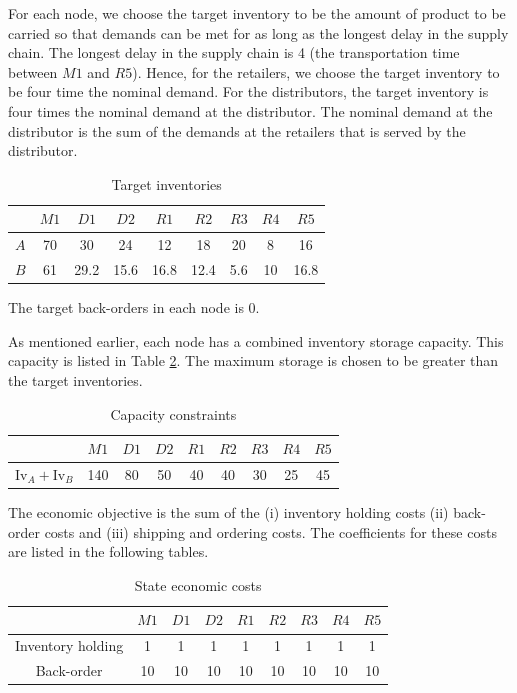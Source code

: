 \documentclass[10pt]{article}
\newcommand{\Inv}{\textrm{Iv}}
\theoremstyle{definition}
\begin{document}
For each node, we choose the target inventory to be the amount of
product to be carried so that demands can be met for as long as the
longest delay in the supply chain. The longest delay in the supply
chain is 4 (the transportation time between $M1$ and $R5$). Hence, for
the retailers, we choose the target inventory to be four time the
nominal demand. For the distributors, the target inventory is four
times the nominal demand at the distributor. The nominal demand at the
distributor is the sum of the demands at the retailers that is served
by the distributor. 

\begin{table}
\caption{Target inventories}
\label{tab:targinv}
\begin{center}
\begin{tabular}{ccccccccc}\toprule
& $M1$ & $D1$ & $D2$  & $R1$ & $R2$ & $R3$ & $R4$ & $R5$ \\
\midrule
$A$&70&30  &24   &12  &18  &20 &8 &16\\
$B$&61&29.2&15.6 &16.8&12.4&5.6&10&16.8 \\
\bottomrule
\end{tabular}
\end{center}
\end{table}

The target back-orders in each node is $0$.

As mentioned earlier, each node has a combined inventory storage
capacity. This capacity is listed in Table \ref{tab:constraints}. The
maximum storage is chosen to be greater than the target inventories.
\begin{table}
\caption{Capacity constraints}
\label{tab:constraints}
\begin{center}
\begin{tabular}{ccccccccc}\toprule
& $M1$ & $D1$ & $D2$  & $R1$ & $R2$ & $R3$ & $R4$ & $R5$ \\
\midrule
$\Inv_A+\Inv_B$&140&80  &50   &40  &40  &30 &25 &45\\
\bottomrule
\end{tabular}
\end{center}
\end{table}

The economic objective is the sum of the (i) inventory holding costs
(ii) back-order costs and (iii) shipping and ordering costs. The
coefficients for these costs are listed in the following tables.

\begin{table}
\caption{State economic costs}
\label{tab:state_economic}
\begin{center}
\begin{tabular}{ccccccccc}\toprule
& $M1$ & $D1$ & $D2$  & $R1$ & $R2$ & $R3$ & $R4$ & $R5$ \\
\midrule
Inventory holding&1&1  &1   &1  &1  &1 &1 &1\\
Back-order&10&10&10 &10&10&10&10&10 \\
\bottomrule
\end{tabular}
\end{center}
\end{table}
\end{document}

